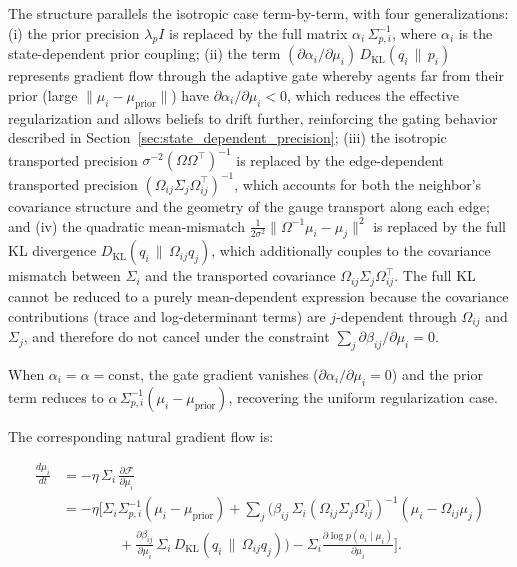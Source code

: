 \documentclass[twoside,11pt]{article}
\begin{document}
The structure parallels the isotropic case term-by-term, with four generalizations: (i) the prior precision $\lambda_p I$ is replaced by the full matrix $\alpha_i\,\Sigma_{p,i}^{-1}$, where $\alpha_i$ is the state-dependent prior coupling; (ii) the term $(\partial\alpha_i/\partial\mu_i)\,D_{\mathrm{KL}}(q_i \,\|\, p_i)$ represents gradient flow through the adaptive gate whereby agents far from their prior (large $\|\mu_i - \mu_{\text{prior}}\|$) have $\partial\alpha_i/\partial\mu_i < 0$, which reduces the effective regularization and allows beliefs to drift further, reinforcing the gating behavior described in Section~\ref{sec:state_dependent_precision}; (iii) the isotropic transported precision $\sigma^{-2}(\Omega\Omega^\top)^{-1}$ is replaced by the edge-dependent transported precision $(\Omega_{ij}\Sigma_j\Omega_{ij}^\top)^{-1}$, which accounts for both the neighbor's covariance structure and the geometry of the gauge transport along each edge; and (iv) the quadratic mean-mismatch $\frac{1}{2\sigma^2}\|\Omega^{-1}\mu_i - \mu_j\|^2$ is replaced by the full KL divergence $D_{\mathrm{KL}}(q_i \,\|\, \Omega_{ij}q_j)$, which additionally couples to the covariance mismatch between $\Sigma_i$ and the transported covariance $\Omega_{ij}\Sigma_j\Omega_{ij}^\top$. The full KL cannot be reduced to a purely mean-dependent expression because the covariance contributions (trace and log-determinant terms) are $j$-dependent through $\Omega_{ij}$ and $\Sigma_j$, and therefore do not cancel under the constraint $\sum_j \partial\beta_{ij}/\partial\mu_i = 0$.

When $\alpha_i = \alpha = \text{const}$, the gate gradient vanishes ($\partial\alpha_i/\partial\mu_i = 0$) and the prior term reduces to $\alpha\,\Sigma_{p,i}^{-1}(\mu_i - \mu_{\text{prior}})$, recovering the uniform regularization case.

The corresponding natural gradient flow is:

\begin{equation}
\boxed{
\begin{aligned}
\frac{d\mu_i}{dt}
&= -\eta\,\Sigma_i\,\frac{\partial \mathcal{F}}{\partial \mu_i} \\
&= -\eta \Bigg[
    \Sigma_i\Sigma_{p,i}^{-1}(\mu_i - \mu_{\text{prior}})
    + \sum_j \bigg(
        \beta_{ij}\,\Sigma_i
        \left(\Omega_{ij}\Sigma_j\Omega_{ij}^\top\right)^{-1}
        (\mu_i - \Omega_{ij}\mu_j) \\
&\qquad\qquad
        + \frac{\partial \beta_{ij}}{\partial \mu_i}\,\Sigma_i\,
          D_{\mathrm{KL}}(q_i \,\|\, \Omega_{ij} q_j)
    \bigg)
    - \Sigma_i\frac{\partial \log p(o_i \mid \mu_i)}{\partial \mu_i}
\Bigg].
\end{aligned}
}
\label{eq:natural_gradient_general}
\end{equation}
\end{document}
